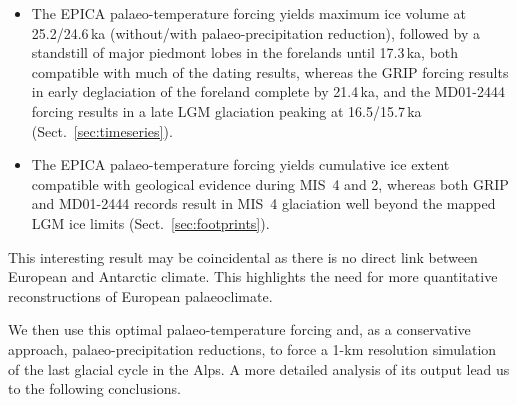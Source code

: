 \documentclass[tc, manuscript]{copernicus}
\begin{document}
    \begin{itemize}
      \item The EPICA palaeo-temperature forcing yields maximum ice volume at
            25.2/24.6\,ka (without/with palaeo-precipitation reduction),
            followed by a standstill of major piedmont lobes in the forelands
            until 17.3\,ka, both compatible with much of the dating results,
            whereas the GRIP forcing results in early deglaciation of the
            foreland complete by 21.4\,ka, and the MD01-2444 forcing results in
            a late LGM glaciation peaking at 16.5/15.7\,ka
            (Sect.~\ref{sec:timeseries}).
      \item The EPICA palaeo-temperature forcing yields cumulative ice extent
            compatible with geological evidence during MIS~4 and 2, whereas
            both GRIP and MD01-2444 records result in MIS~4 glaciation well
            beyond the mapped LGM ice limits (Sect.~\ref{sec:footprints}).
    \end{itemize}

    This interesting result may be coincidental as there is no direct link
    between European and Antarctic climate. This highlights the need for more
    quantitative reconstructions of European palaeoclimate.

    We then use this optimal palaeo-temperature forcing and, as a conservative
    approach, palaeo-precipitation reductions, to force a 1-km resolution
    simulation of the last glacial cycle in the Alps. A more detailed analysis
    of its output lead us to the following conclusions.
\end{document}
